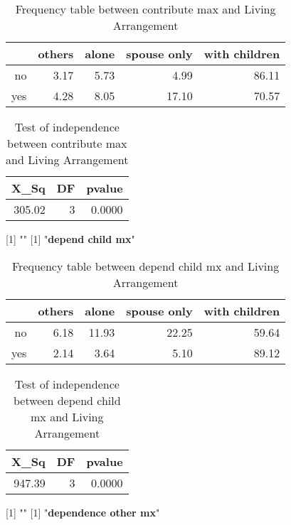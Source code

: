 \documentclass[11pt]{article}
\begin{document}
\begin{table}[H]
\centering
\begin{tabular}{rrrrr}
  \hline
 & others & alone & spouse only & with children \\ 
  \hline
no & 3.17 & 5.73 & 4.99 & 86.11 \\ 
  yes & 4.28 & 8.05 & 17.10 & 70.57 \\ 
   \hline
\end{tabular}
\caption{Frequency table between contribute max and Living Arrangement} 
\end{table}
\begin{table}[H]
\centering
\begin{tabular}{rrr}
  \hline
X\_Sq & DF & pvalue \\ 
  \hline
305.02 & 3 & 0.0000 \\ 
   \hline
\end{tabular}
\caption{Test of independence between contribute max and Living Arrangement} 
\end{table}
[1] "\newline"
[1] "{\bf{depend child mx}}"
\begin{table}[H]
\centering
\begin{tabular}{rrrrr}
  \hline
 & others & alone & spouse only & with children \\ 
  \hline
no & 6.18 & 11.93 & 22.25 & 59.64 \\ 
  yes & 2.14 & 3.64 & 5.10 & 89.12 \\ 
   \hline
\end{tabular}
\caption{Frequency table between depend child mx and Living Arrangement} 
\end{table}
\begin{table}[H]
\centering
\begin{tabular}{rrr}
  \hline
X\_Sq & DF & pvalue \\ 
  \hline
947.39 & 3 & 0.0000 \\ 
   \hline
\end{tabular}
\caption{Test of independence between depend child mx and Living Arrangement} 
\end{table}
[1] "\newline"
[1] "{\bf{dependence other mx}}"
\end{document}

